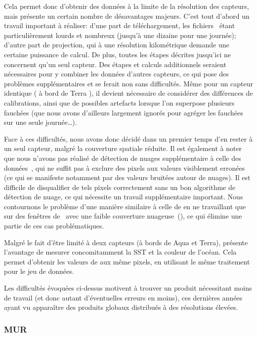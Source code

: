 Cela permet donc d'obtenir des données à la limite de la résolution des capteurs, mais présente un certain nombre de désavantages majeurs.
C'est tout d'abord un travail important à réaliser: d'une part de téléchargement, les fichiers~ étant particulièrement lourds et nombreux (jusqu'à une dizaine pour une journée); d'autre part de projection, qui à une résolution kilométrique demande une certaine puissance de calcul.
De plus, toutes les étapes décrites jusqu'ici ne concernent qu'un seul capteur.
Des étapes et calculs additionnels seraient nécessaires pour y combiner les données d'autres capteurs, ce qui pose des problèmes supplémentaires et se ferait non sans difficultés.
Même pour un capteur identique ( à bord de Terra ), il devient nécessaire de considérer des différences de calibrations, ainsi que de possibles artefacts lorsque l'on superpose plusieurs fauchées (que nous avons d'ailleurs largement ignorés pour agréger les fauchées sur une seule journée\dots).

Face à ces difficultés, nous avons donc décidé dans un premier temps d'en rester à un seul capteur, malgré la couverture spatiale réduite.
Il est également à noter que nous n'avons pas réalisé de détection de nuages supplémentaire à celle des données~, qui ne suffit pas à exclure des pixels aux valeurs visiblement erronées (ce qui se manifeste notamment par des valeurs bruitées autour de nuages).
Il est difficile de disqualifier de tels pixels correctement sans un bon algorithme de détection de nuage, ce qui nécessite un travail supplémentaire important.
Nous contournons le problème d'une manière similaire à celle de \citeauthor{liu_2016} en ne travaillant que sur des fenêtres de~ avec une faible couverture nuageuse~(), ce qui élimine une partie de ces cas problématiques.

Malgré le fait d'être limité à deux capteurs (à bords de Aqua et Terra),  présente l'avantage de mesurer concomitamment la SST et la couleur de l'océan.
Cela permet d'obtenir les valeurs de  aux même pixels, en utilisant le même traitement pour le jeu de données.


Les difficultés évoquées ci-dessus motivent à trouver un produit nécessitant moins de travail (et donc autant d'éventuelles erreurs en moins), ces dernières années ayant vu apparaître des produits globaux distribués à des résolutions élevées.

\subsubsection{MUR}

